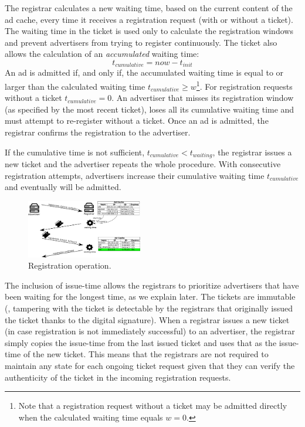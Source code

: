 The registrar calculates a new waiting time, based on the current content of
the ad cache, every time it receives a registration request (with or without
a ticket). The waiting time in the ticket is used only to calculate the
registration windows and prevent advertisers from trying to register
continuously. The ticket also allows the calculation of an \emph{accumulated} waiting time:
\begin{equation}
    t_\textit{cumulative} = \textit{now} - t_\textit{init}
\end{equation}
An ad is admitted if, and only if, the accumulated waiting time is equal to or larger than the calculated waiting time $t_\textit{cumulative} \ge w$\footnote{Note that a registration request without a ticket may be admitted directly when the calculated waiting time equals $w=0$.}. 
For registration requests without a ticket $t_\textit{cumulative} = 0$. An advertiser that misses its registration window (as specified by the most recent ticket), loses all its cumulative waiting time and must attempt to re-register without a ticket. Once an ad is admitted, the registrar confirms the registration to the advertiser.

If the cumulative time is not sufficient, $t_\textit{cumulative} < t_\textit{waiting}$, the registrar issues a new ticket and the advertiser repeats the whole procedure.
With consecutive registration attempts, advertisers increase their cumulative waiting time $t_\textit{cumulative}$ and eventually will be admitted. 


\begin{figure}
    \includegraphics[width=0.45\textwidth]{img/registration}
    \vspace{-0.15in}
    \caption{Registration operation.}
    \label{fig:registration}
    \vspace{-0.15in}
\end{figure}

The inclusion of issue-time allows the registrars to prioritize advertisers that have been waiting for the longest time, as we explain later. The tickets are immutable (\ie, tampering with the ticket is detectable by the registrars that originally issued the ticket thanks to the digital signature). When a registrar issues a new ticket (in case registration is not immediately successful) to an advertiser, the registrar simply copies the issue-time from the last issued ticket and uses that as the issue-time of the new ticket. This means that the registrars are not required to maintain any state for each ongoing ticket request given that they can verify the authenticity of the ticket in the incoming registration requests.



